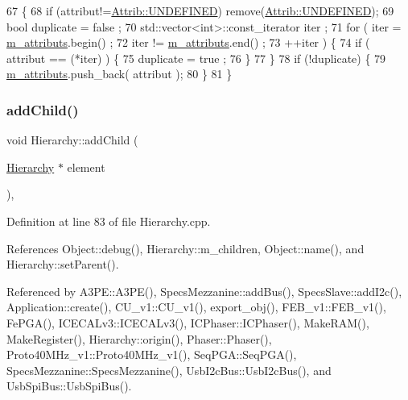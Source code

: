 \begin{DoxyCode}
67                             \{
68     \textcolor{keywordflow}{if} (attribut!=\hyperlink{classAttrib_a69e171d7cc6417835a5a306d3c764235a3a8da2ab97dda18aebab196fe4100531}{Attrib::UNDEFINED}) \textcolor{keyword}{remove}(\hyperlink{classAttrib_a69e171d7cc6417835a5a306d3c764235a3a8da2ab97dda18aebab196fe4100531}{Attrib::UNDEFINED});
69     \textcolor{keywordtype}{bool} duplicate = false ;
70     std::vector<int>::const\_iterator iter ;
71     \textcolor{keywordflow}{for} ( iter  = \hyperlink{classAttrib_ac4bd58a0cc6b38a3b711d609a3d3aacc}{m\_attributs}.begin() ;
72           iter != \hyperlink{classAttrib_ac4bd58a0cc6b38a3b711d609a3d3aacc}{m\_attributs}.end()   ;
73           ++iter ) \{
74       \textcolor{keywordflow}{if} ( attribut == (*iter) ) \{
75         duplicate = true ;
76       \}
77     \}
78     \textcolor{keywordflow}{if} (!duplicate) \{
79       \hyperlink{classAttrib_ac4bd58a0cc6b38a3b711d609a3d3aacc}{m\_attributs}.push\_back( attribut );
80     \}
81   \}
\end{DoxyCode}
\mbox{\label{classHierarchy_ad677774ff38fcb257c04a3a10d471fac}} 
\subsubsection{\texorpdfstring{add\+Child()}{addChild()}}
{\footnotesize\ttfamily void Hierarchy\+::add\+Child (\begin{DoxyParamCaption}\item[{\hyperlink{classHierarchy}{Hierarchy} $\ast$}]{element }\end{DoxyParamCaption})\hspace{0.3cm}{\ttfamily [virtual]}, {\ttfamily [inherited]}}



Definition at line 83 of file Hierarchy.\+cpp.



References Object\+::debug(), Hierarchy\+::m\+\_\+children, Object\+::name(), and Hierarchy\+::set\+Parent().



Referenced by A3\+P\+E\+::\+A3\+P\+E(), Specs\+Mezzanine\+::add\+Bus(), Specs\+Slave\+::add\+I2c(), Application\+::create(), C\+U\+\_\+v1\+::\+C\+U\+\_\+v1(), export\+\_\+obj(), F\+E\+B\+\_\+v1\+::\+F\+E\+B\+\_\+v1(), Fe\+P\+G\+A(), I\+C\+E\+C\+A\+Lv3\+::\+I\+C\+E\+C\+A\+Lv3(), I\+C\+Phaser\+::\+I\+C\+Phaser(), Make\+R\+A\+M(), Make\+Register(), Hierarchy\+::origin(), Phaser\+::\+Phaser(), Proto40\+M\+Hz\+\_\+v1\+::\+Proto40\+M\+Hz\+\_\+v1(), Seq\+P\+G\+A\+::\+Seq\+P\+G\+A(), Specs\+Mezzanine\+::\+Specs\+Mezzanine(), Usb\+I2c\+Bus\+::\+Usb\+I2c\+Bus(), and Usb\+Spi\+Bus\+::\+Usb\+Spi\+Bus().


